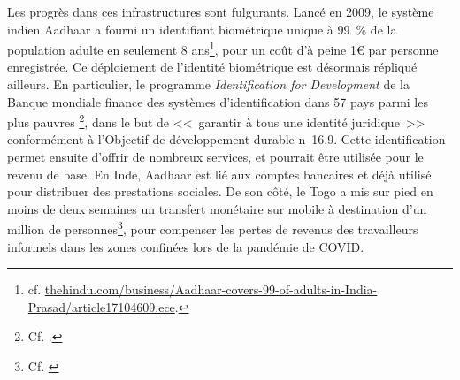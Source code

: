 \documentclass[a5paper,french]{memoir}
\begin{document}


Les progrès dans ces infrastructures sont fulgurants. Lancé en 2009, le système indien Aadhaar a fourni un identifiant biométrique unique à 99~\% de la population adulte en seulement 8 ans\footnote{cf. \href{https://www.thehindu.com/business/Aadhaar-covers-99-of-adults-in-India-Prasad/article17104609.ece}{thehindu.com/business/Aadhaar-covers-99-of-adults-in-India-Prasad/article17104609.ece}.}, pour un coût d'à peine 1\euro{} par personne enregistrée. Ce déploiement de l'identité biométrique est désormais répliqué ailleurs. %
En particulier, le programme \textit{Identification for Development} de la Banque mondiale finance des systèmes d'identification dans 57 pays parmi les plus pauvres 
\footnote{Cf. \cite{world_bank_state_2017,world_bank_benin-burkina-faso-togo-and-niger-second-phase--west-africa-unique-identification-for-regional-integration-and-inclusion-wuri-projectpdf_2020,world_bank_identification_2022}.}, dans le but de <<~garantir à tous une identité juridique~>> conformément à l'Objectif de développement durable n\textdegree{}~16.9. Cette identification permet ensuite d'offrir de nombreux services, et pourrait être utilisée pour le revenu de base. En Inde, Aadhaar est lié aux comptes bancaires et déjà utilisé pour distribuer des prestations sociales. De son côté, le Togo a mis sur pied en moins de deux semaines un transfert monétaire sur mobile à destination d'un million de personnes\footnote{Cf. \cite{ipa_togos_2021}}, pour compenser les pertes de revenus des travailleurs informels dans les zones confinées lors de la pandémie de COVID. 
\end{document}
